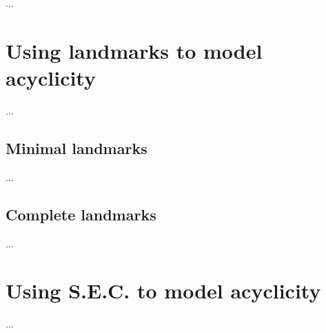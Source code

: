 ...

\section{Using landmarks to model acyclicity}
...

\subsection{Minimal landmarks}
...

\subsection{Complete landmarks}
...

\section{Using S.E.C. to model acyclicity}
...
